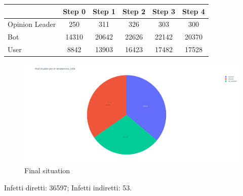             \begin{table}[H]
                \centering
                \begin{tabular}{|l|c|c|c|c|c|}
                \hline
                               & Step 0 & Step 1 & Step 2 & Step 3 & Step 4 \\ \hline
                Opinion Leader & 250    & 311    & 326    & 303    & 300    \\ \hline
                Bot            & 14310  & 20642  & 22626  & 22142  & 20370  \\ \hline
                User           & 8842   & 13903  & 16423  & 17482  & 17528  \\ \hline
                \end{tabular}
            \end{table}
            
            \begin{figure}[H]
                \includegraphics[width=16cm]{resources/charts/btw_1000_pie.png}
                \caption{Final situation}
                \label{fig:btw_1000_pie}
            \end{figure}
            Infetti diretti: 36597;\newline
            Infetti indiretti: 53.
            
            
